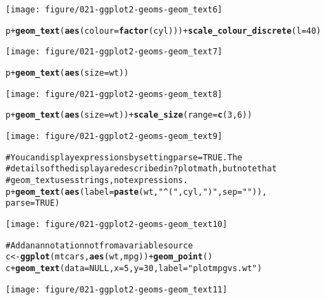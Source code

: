 \documentclass[a4paper,titlepage]{tufte-handout}\usepackage{graphicx, color}
\makeatletter
\def\maxwidth{ %
  \ifdim\Gin@nat@width>\linewidth
    \linewidth
  \else
    \Gin@nat@width
  \fi
}
\newcommand{\hlfunctioncall}[1]{\textcolor[rgb]{0.501960784313725,0,0.329411764705882}{\textbf{#1}}}%
\newcommand{\hlstring}[1]{\textcolor[rgb]{0.6,0.6,1}{#1}}%
\newcommand{\hlcomment}[1]{\textcolor[rgb]{0.180392156862745,0.6,0.341176470588235}{#1}}%
\newenvironment{kframe}{%
 \def\at@end@of@kframe{}%
 \ifinner\ifhmode%
  \def\at@end@of@kframe{\end{minipage}}%
  \begin{minipage}{\columnwidth}%
 \fi\fi%
 \def\FrameCommand##1{\hskip\@totalleftmargin \hskip-\fboxsep
 \colorbox{shadecolor}{##1}\hskip-\fboxsep
     \hskip-\linewidth \hskip-\@totalleftmargin \hskip\columnwidth}%
 \MakeFramed {\advance\hsize-\width
   \@totalleftmargin\z@ \linewidth\hsize
   \@setminipage}}%
 {\par\unskip\endMakeFramed%
 \at@end@of@kframe}
\newenvironment{knitrout}{}{} %
\makeatother
\begin{document}
\begin{knitrout}
\begin{kframe}
\begin{alltt}
\end{alltt}
\end{kframe}\texttt{[image: figure/021-ggplot2-geoms-geom\_text6]} \begin{kframe}\begin{alltt}
p + \hlfunctioncall{geom_text}(\hlfunctioncall{aes}(colour=\hlfunctioncall{factor}(cyl))) + \hlfunctioncall{scale_colour_discrete}(l=40)
\end{alltt}
\end{kframe}\texttt{[image: figure/021-ggplot2-geoms-geom\_text7]} \begin{kframe}\begin{alltt}
p + \hlfunctioncall{geom_text}(\hlfunctioncall{aes}(size=wt))
\end{alltt}
\end{kframe}\texttt{[image: figure/021-ggplot2-geoms-geom\_text8]} \begin{kframe}\begin{alltt}
p + \hlfunctioncall{geom_text}(\hlfunctioncall{aes}(size=wt)) + \hlfunctioncall{scale_size}(range=\hlfunctioncall{c}(3,6))
\end{alltt}
\end{kframe}\texttt{[image: figure/021-ggplot2-geoms-geom\_text9]} \begin{kframe}\begin{alltt}
\hlcomment{# You can display expressions by setting parse = TRUE.  The}
\hlcomment{# details of the display are described in ?plotmath, but note that}
\hlcomment{# geom_text uses strings, not expressions.}
p + \hlfunctioncall{geom_text}(\hlfunctioncall{aes}(label = \hlfunctioncall{paste}(wt, \hlstring{"^("}, cyl, \hlstring{")"}, sep = \hlstring{""})),
  parse = TRUE)
\end{alltt}
\end{kframe}\texttt{[image: figure/021-ggplot2-geoms-geom\_text10]} \begin{kframe}\begin{alltt}
\hlcomment{# Add an annotation not from a variable source}
c <- \hlfunctioncall{ggplot}(mtcars, \hlfunctioncall{aes}(wt, mpg)) + \hlfunctioncall{geom_point}()
c + \hlfunctioncall{geom_text}(data = NULL, x = 5, y = 30, label = \hlstring{"plot mpg vs. wt"})
\end{alltt}
\end{kframe}\texttt{[image: figure/021-ggplot2-geoms-geom\_text11]} \begin{kframe}\begin{alltt}

\end{alltt}
\end{kframe}
\end{knitrout}
\end{document}

